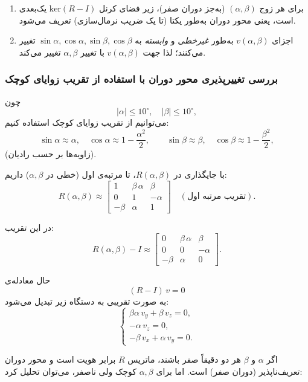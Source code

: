 \documentclass{article}
\begin{document}
\begin{enumerate}
	\item برای هر زوج \((\alpha,\beta)\) (به‌جز دوران صفر)، زیر فضای کرنل \(\mathrm{ker}(R-I)\) یک‌بعدی است، یعنی محور دوران به‌طور یکتا (تا یک ضریب نرمال‌سازی) تعریف می‌شود.
	\item اجزای \(v(\alpha,\beta)\) به‌طور \emph{غیرخطی} و \emph{وابسته} به \(\sin\alpha,\cos\alpha,\sin\beta,\cos\beta\) تغییر می‌کنند؛ لذا جهت \(v(\alpha,\beta)\) با تغییر \(\alpha,\beta\) تغییر می‌کند.
\end{enumerate}

\subsubsection{بررسی تغییرپذیری محور دوران با استفاده از تقریب زوایای کوچک}

چون
\[
|\alpha|\le 10^\circ,\quad |\beta|\le 10^\circ,
\]
می‌توانیم از تقریب زوایای کوچک استفاده کنیم:
\[
\sin\alpha \approx \alpha,\quad \cos\alpha \approx 1 - \frac{\alpha^2}{2},\qquad
\sin\beta \approx \beta,\quad \cos\beta \approx 1 - \frac{\beta^2}{2},
\]
(زاویه‌ها بر حسب رادیان).

با جایگذاری در \(R(\alpha,\beta)\)، تا مرتبه‌ی اول (خطی در \(\alpha,\beta\)) داریم:
\[
R(\alpha,\beta) \approx
\begin{bmatrix}
	1 & \beta\,\alpha & \beta\\[4pt]
	0 & 1 & -\alpha\\[4pt]
	-\beta & \alpha & 1
\end{bmatrix}
\quad (\text{تقریب مرتبه اول}).
\]

در این تقریب:
\[
R(\alpha,\beta) - I \approx
\begin{bmatrix}
	0 & \beta\,\alpha & \beta\\[4pt]
	0 & 0 & -\alpha\\[4pt]
	-\beta & \alpha & 0
\end{bmatrix}.
\]

حال معادله‌ی
\[
(R - I)\,v = 0
\]
به صورت تقریبی به دستگاه زیر تبدیل می‌شود:
\[
\begin{cases}
	\beta\alpha\,v_y + \beta\,v_z = 0,\\[4pt]
	-\alpha\,v_z = 0,\\[4pt]
	-\beta\,v_x + \alpha\,v_y = 0.
\end{cases}
\]

اگر \(\alpha\) و \(\beta\) هر دو دقیقاً صفر باشند، ماتریس \(R\) برابر هویت است و محور دوران تعریف‌ناپذیر (دوران صفر) است. اما برای \(\alpha,\beta\) کوچک ولی ناصفر، می‌توان تحلیل کرد:
\end{document}
